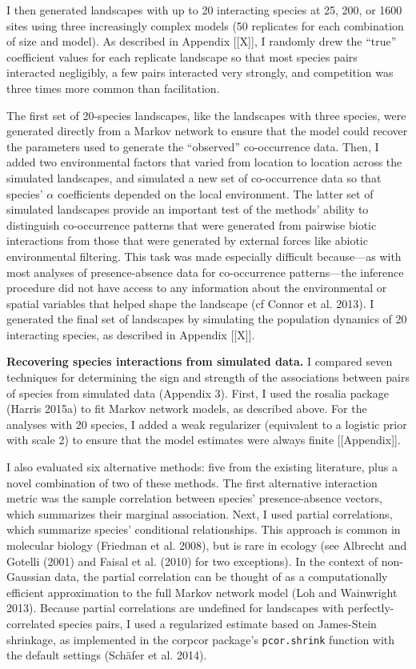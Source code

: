 \documentclass[12pt,]{article}
\begin{document}
\begin{spacing}{1.9}
\begin{flushleft}
I then generated landscapes with up to 20 interacting species at 25,
200, or 1600 sites using three increasingly complex models (50
replicates for each combination of size and model). As described in
Appendix {[}{[}X{]}{]}, I randomly drew the ``true'' coefficient values
for each replicate landscape so that most species pairs interacted
negligibly, a few pairs interacted very strongly, and competition was
three times more common than facilitation.

The first set of 20-species landscapes, like the landscapes with three
species, were generated directly from a Markov network to ensure that
the model could recover the parameters used to generate the ``observed''
co-occurrence data. Then, I added two environmental factors that varied
from location to location across the simulated landscapes, and simulated
a new set of co-occurrence data so that species' \(\alpha\) coefficients
depended on the local environment. The latter set of simulated
landscapes provide an important test of the methods' ability to
distinguish co-occurrence patterns that were generated from pairwise
biotic interactions from those that were generated by external forces
like abiotic environmental filtering. This task was made especially
difficult because---as with most analyses of presence-absence data for
co-occurrence patterns---the inference procedure did not have access to
any information about the environmental or spatial variables that helped
shape the landscape (cf Connor et al. 2013). I generated the final set
of landscapes by simulating the population dynamics of 20 interacting
species, as described in Appendix {[}{[}X{]}{]}.

\noindent \textbf{Recovering species interactions from simulated data.}
I compared seven techniques for determining the sign and strength of the
associations between pairs of species from simulated data (Appendix 3).
First, I used the rosalia package (Harris 2015a) to fit Markov network
models, as described above. For the analyses with 20 species, I added a
weak regularizer (equivalent to a logistic prior with scale 2) to ensure
that the model estimates were always finite {[}{[}Appendix{]}{]}.

I also evaluated six alternative methods: five from the existing
literature, plus a novel combination of two of these methods. The first
alternative interaction metric was the sample correlation between
species' presence-absence vectors, which summarizes their marginal
association. Next, I used partial correlations, which summarize species'
conditional relationships. This approach is common in molecular biology
(Friedman et al. 2008), but is rare in ecology (see Albrecht and Gotelli
(2001) and Faisal et al. (2010) for two exceptions). In the context of
non-Gaussian data, the partial correlation can be thought of as a
computationally efficient approximation to the full Markov network model
(Loh and Wainwright 2013). Because partial correlations are undefined
for landscapes with perfectly-correlated species pairs, I used a
regularized estimate based on James-Stein shrinkage, as implemented in
the corpcor package's \texttt{pcor.shrink} function with the default
settings (Schäfer et al. 2014).


\end{flushleft}
\end{spacing}
\end{document}
